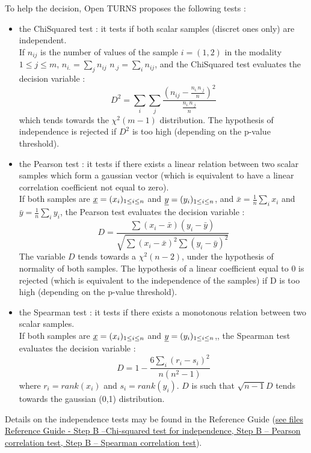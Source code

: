 To help the decision, Open TURNS proposes the following tests :
\begin{itemize}
\item the ChiSquared test : it tests if both scalar samples (discret ones only) are independent.\\
  If $n_{ij}$ is the number of values of the sample $i=(1,2)$ in the modality $1 \leq j \leq m$, $\displaystyle n_{i.} = \sum_j n_{ij}$ $\displaystyle n_{.j} = \sum_i n_{ij}$, and the ChiSquared test evaluates the decision variable :
  $$
  D^2 = \displaystyle \sum_i \sum_j \frac{( n_{ij} - \frac{n_{i.} n_{.j}}{n} )^2}{\frac{n_{i.} n_{.j}}{n}}
  $$
  which tends towards the $\chi^2(m-1)$ distribution. The hypothesis of independence is rejected if $D^2$ is too high (depending on the p-value threshold).

\item the Pearson test : it tests if there exists a linear relation between two scalar samples which form a gaussian vector (which is equivalent to have a linear correlation coefficient not equal to zero). \\
  If both samples are ${\underline{x}} = (x_i)_{1 \leq i \leq n}$ and ${\underline{y}} = (y_i)_{1 \leq i \leq n}$, and $\bar{x} = \displaystyle \frac{1}{n}\sum_i x_i$ and $\bar{y} = \displaystyle \frac{1}{n}\sum_i y_i$, the Pearson test evaluates the decision variable :
  $$
  D = \displaystyle \frac{\sum (x_i - \bar{x})(y_i - \bar{y})}{\sqrt{\sum (x_i - \bar{x})^2\sum (y_i - \bar{y})^2}}
  $$
  The variable $D$ tends towards a $\chi^2(n-2)$, under the hypothesis of normality of both samples. The hypothesis of a linear coefficient equal to 0 is rejected (which is equivalent to the independence of the samples) if D is too high (depending on the p-value threshold).

\item the Spearman test : it tests if there exists a monotonous relation between two scalar samples.\\
  If both samples are ${\underline{x}} = (x_i)_{1 \leq i \leq n}$ and ${\underline{y}}= (y_i)_{1 \leq i \leq n}$,, the Spearman test evaluates the decision variable :
  $$
  D = \displaystyle 1-\frac{6\sum_i (r_i - s_i)^2}{n(n^2-1)}
  $$
  where $r_i = rank(x_i)$ and  $s_i = rank(y_i)$. $D$ is such that $\sqrt{n-1}D$ tends towards the gaussian (0,1) distribution.
\end{itemize}




Details on the independence tests  may be found in the Reference Guide (\href{OpenTURNS_ReferenceGuide.pdf}{see files Reference Guide - Step B --Chi-squared test for independence, Step B -- Pearson correlation test, Step B -- Spearman correlation test}).\\

